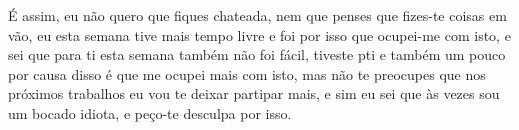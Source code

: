 É assim, eu não quero que fiques chateada, nem que penses que fizes-te coisas em vão, eu esta semana tive mais tempo livre e foi por isso que ocupei-me com isto, e sei que para ti esta semana também não foi fácil, tiveste pti e também um pouco por causa disso é que me ocupei mais com isto, mas não te preocupes que nos próximos trabalhos eu vou te deixar partipar mais, e sim eu sei que às vezes sou um bocado idiota, e peço-te desculpa por isso.
